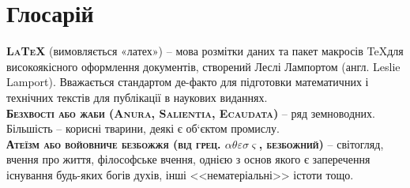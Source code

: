 
\newpage
\chapter*{Глосарій}

\textbf{\textsc{\LaTeX}} (вимовляється «латех») -- мова розмітки даних та пакет макросів \TeX для високоякісного оформлення документів, створений Леслі Лампортом (англ. Leslie Lamport). Вважається стандартом де-факто для підготовки математичних і технічних текстів для публікації в наукових виданнях. \\

\textbf{\textsc{Безхвості або жаби (Anura, Salientia, Ecaudata)}} -- ряд земноводних. Більшість -- корисні тварини, деякі є об`єктом промислу. \\

\textbf{\textsc{Атеїзм або войовниче безбожжя (від грец. $\alpha\theta\varepsilon\sigma\varsigma$, безбожний)}} -- світогляд, вчення про життя, філософське вчення, однією з основ якого є заперечення існування будь-яких богів духів, інші <<нематеріальні>> істоти тощо. \\









